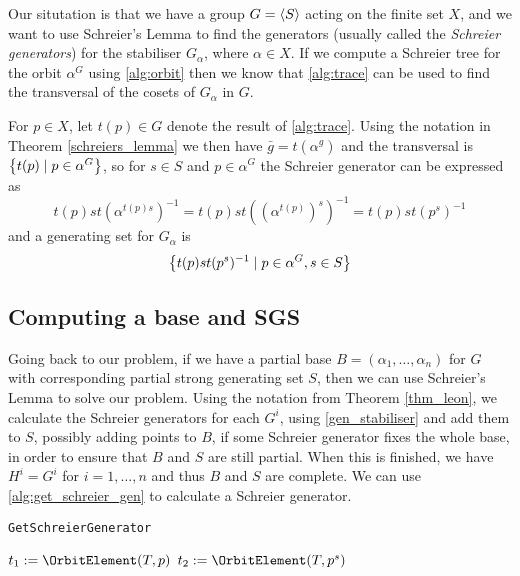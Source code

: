 Our situtation is that we have a group $G = \left\langle S \right\rangle$ acting on the finite set
$X$, and we want to use Schreier's Lemma to find the generators
(usually called the \emph{Schreier generators}) for the stabiliser
$G_{\alpha}$, where $\alpha \in X$. If we compute a Schreier tree for
the orbit $\alpha^G$ using \ref{alg:orbit} then we know that
\ref{alg:trace} can be used to find the transversal of the cosets of
$G_{\alpha}$ in $G$. 

For $p \in X$, let $t(p) \in G$ denote the result of \ref{alg:trace}.
Using the notation in Theorem \ref{schreiers_lemma} we then have $\bar{g} =
t(\alpha^g)$ and the transversal is $\left\lbrace t(p) \mid p \in \alpha^G \right\rbrace$,
so for $s \in S$ and $p \in \alpha^G$ the Schreier generator can be
expressed as
\begin{equation} 
t(p) s t(\alpha^{t(p) s})^{-1} = t(p) s t((\alpha^{t(p)})^s)^{-1} = t(p) s t(p^s)^{-1}
\end{equation}
and a generating set for $G_{\alpha}$ is
\begin{equation} \label{gen_stabiliser}
\left\lbrace t(p) s t(p^s)^{-1} \mid p \in \alpha^G, s \in S \right\rbrace
\end{equation}

\subsection{Computing a base and SGS}
Going back to our problem, if we have a partial base $B = (\alpha_1,
\dotsc, \alpha_n)$ for $G$ with corresponding partial strong
generating set $S$, then we can use Schreier's Lemma to solve our
problem. Using the notation from Theorem \ref{thm_leon}, we calculate
the Schreier generators for each $G^i$, using \eqref{gen_stabiliser} and add them to $S$, possibly
adding points to $B$, if some Schreier generator fixes the whole base,
in order to ensure that $B$ and $S$ are still partial. When this is
finished, we have $H^i = G^i$ for $i = 1, \dotsc, n$ and thus $B$ and
$S$ are complete. We can use \ref{alg:get_schreier_gen} to calculate a Schreier generator.

\begin{algorithm} 
\dontprintsemicolon
\caption{\texttt{GetSchreierGenerator}}
\Begin
{
  $t_1 := \OrbitElement(T, p)$ \;
  $t_2 := \OrbitElement(T, p^s)$ \;
}
\label{alg:get_schreier_gen}
\end{algorithm}

